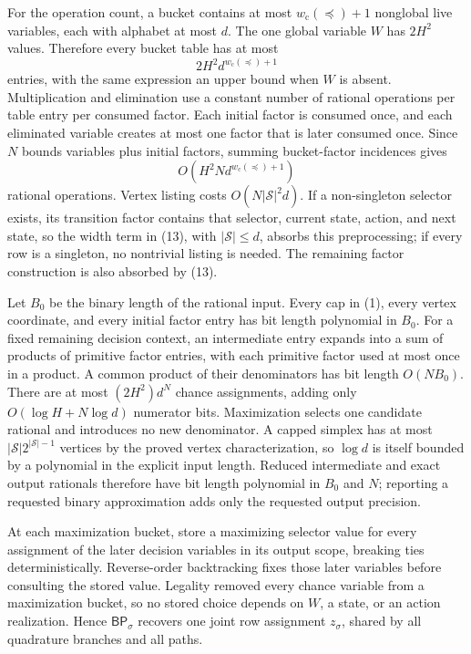 For the operation count, a bucket contains at most \(w_{\mathrm c}(\preceq)+1\) nonglobal live variables, each with alphabet at most \(d\).  The one global variable \(W\) has \(2H^2\) values.  Therefore every bucket table has at most
\[
 2H^2d^{w_{\mathrm c}(\preceq)+1}
 \tag{12}
\]
entries, with the same expression an upper bound when \(W\) is absent.  Multiplication and elimination use a constant number of rational operations per table entry per consumed factor.  Each initial factor is consumed once, and each eliminated variable creates at most one factor that is later consumed once.  Since \(N\) bounds variables plus initial factors, summing bucket-factor incidences gives
\[
 O\!\left(H^2N d^{w_{\mathrm c}(\preceq)+1}\right)
 \tag{13}
\]
rational operations.  Vertex listing costs \(O(N|\mathcal S|^2d)\).  If a non-singleton selector exists, its transition factor contains that selector, current state, action, and next state, so the width term in (13), with \(|\mathcal S|\le d\), absorbs this preprocessing; if every row is a singleton, no nontrivial listing is needed.  The remaining factor construction is also absorbed by (13).

Let \(B_0\) be the binary length of the rational input.  Every cap in (1), every vertex coordinate, and every initial factor entry has bit length polynomial in \(B_0\).  For a fixed remaining decision context, an intermediate entry expands into a sum of products of primitive factor entries, with each primitive factor used at most once in a product.  A common product of their denominators has bit length \(O(NB_0)\).  There are at most \((2H^2)d^N\) chance assignments, adding only \(O(\log H+N\log d)\) numerator bits.  Maximization selects one candidate rational and introduces no new denominator.  A capped simplex has at most \(|\mathcal S|2^{|\mathcal S|-1}\) vertices by the proved vertex characterization, so \(\log d\) is itself bounded by a polynomial in the explicit input length.  Reduced intermediate and exact output rationals therefore have bit length polynomial in \(B_0\) and \(N\); reporting a requested binary approximation adds only the requested output precision.

At each maximization bucket, store a maximizing selector value for every assignment of the later decision variables in its output scope, breaking ties deterministically.  Reverse-order backtracking fixes those later variables before consulting the stored value.  Legality removed every chance variable from a maximization bucket, so no stored choice depends on \(W\), a state, or an action realization.  Hence \(\mathsf{BP}_\sigma\) recovers one joint row assignment \(z_\sigma\), shared by all quadrature branches and all paths.

